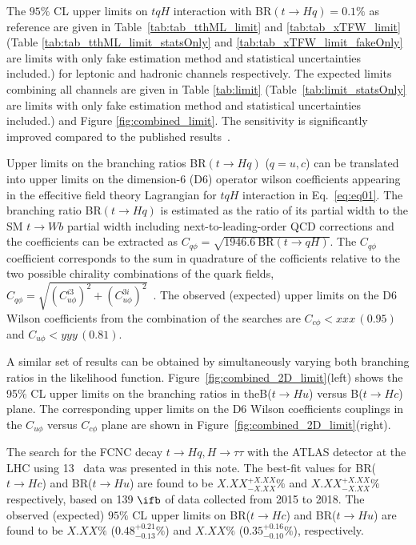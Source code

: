 The $95\%$ CL upper limits on $tqH$ interaction with BR$(t\to Hq)=0.1\%$ as reference are given in Table~\ref{tab:tab_tthML_limit} and \ref{tab:tab_xTFW_limit} (Table \ref{tab:tab_tthML_limit_statsOnly} and \ref{tab:tab_xTFW_limit_fakeOnly} are limits with only fake estimation method and statistical uncertainties included.) for leptonic and hadronic channels respectively. The expected limits combining all channels are given in Table \ref{tab:limit} (Table~\ref{tab:limit_statsOnly} are limits with only fake estimation method and statistical uncertainties included.) and Figure \ref{fig:combined_limit}. The sensitivity is significantly improved compared to the published results~\cite{fcncgmgm,fcncml,fcnctautau}. 

Upper limits on the branching ratios BR$(t\to Hq)$ ($q=u,c$) can be translated into upper limits on the dimension-6 (D6) operator wilson coefficients appearing in the effecitive field theory Lagrangian for $tqH$ interaction in Eq.~\ref{eq:eq01}.
The branching ratio BR$(t\to Hq)$ is estimated as the ratio of its partial width to the SM $t \to Wb$ partial width including next-to-leading-order QCD corrections and the coefficients can be extracted as $C_{q\phi} = \sqrt{1946.6~\text{BR}(t\to qH)}$.
The $C_{q\phi}$ coefficient corresponds to the sum in quadrature of the cofficients relative to the two possible chirality combinations of the quark fields,
$C_{q\phi} =\sqrt{(C^{i3}_{u\phi})^2 + (C^{3i}_{u\phi})^2}$~\cite{fcnc_production_theory}. The observed (expected) upper limits on the D6 Wilson coefficients from the combination of the searches are $C_{c\phi}<xxx\,(0.95)$ and $C_{u\phi}<yyy\,(0.81)$.

A similar set of results can be obtained by simultaneously varying both branching ratios in the likelihood function. Figure~\ref{fig:combined_2D_limit}(left) shows the 95\% CL upper limits on the branching ratios in theB($t\rightarrow Hu$)
versus B($t\rightarrow Hc$) plane. The corresponding upper limits on the D6 Wilson coefficients couplings in the $C_{u\phi}$ versus $C_{c\phi}$ plane are shown in Figure~\ref{fig:combined_2D_limit}(right).

The search for the FCNC decay $t\to Hq, H\to\tau\tau$ with the ATLAS detector at the LHC using 13~\TeV{} data was presented in this note. The best-fit values for BR($t\to Hc$) and BR($t\to Hu$) are found to be $X.XX^{+X.XX}_{-X.XX}\%$ and $X.XX^{+X.XX}_{-X.XX}\%$ respectively, based on 139 $\ifb$ of data collected from 2015 to 2018. The observed (expected) $95\%$ CL upper limits on BR($t\to Hc$) and BR($t\to Hu$) are found to be $X.XX\%$ ($0.48^{+0.21}_{-0.13}\%$) and $X.XX\%$ ($0.35^{+0.16}_{-0.10}\%$), respectively.

